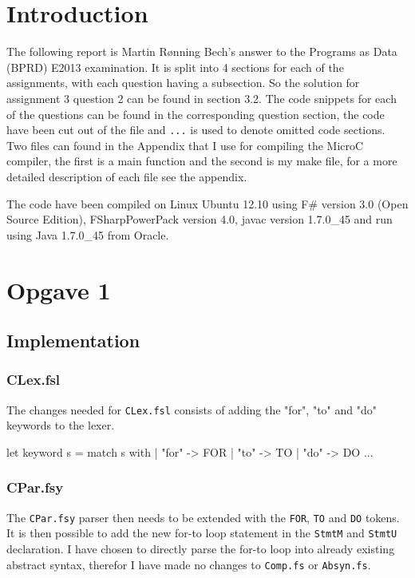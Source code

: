 \section*{Introduction}
The following report is Martin Rønning Bech's answer to the Programs as Data
(BPRD) E2013 examination. It is split into 4 sections for each of the
assignments, with each question having a subsection. So the solution for
assignment 3 question 2 can be found in section 3.2. The code snippets for each
of the questions can be found in the corresponding question section, the code
have been cut out of the file and \texttt{...} is used to denote omitted code
sections. Two files can found in the Appendix that I use for compiling the
MicroC compiler, the first is a main function and the second is my make file,
for a more detailed description of each file see the appendix.

The code have been compiled on Linux Ubuntu 12.10 using F\# version 3.0 (Open
Source Edition), FSharpPowerPack version 4.0, javac version 1.7.0\_45 and run
using Java 1.7.0\_45 from Oracle.

\tableofcontents
\pagebreak


\section{Opgave 1}
\subsection{Implementation}
\subsubsection*{CLex.fsl}
The changes needed for \texttt{CLex.fsl} consists of adding the "for", "to" and "do"
keywords to the lexer.
\begin{fs}
let keyword s =
    match s with
    | "for"     -> FOR
    | "to"      -> TO
    | "do"      -> DO
    ...
\end{fs}
\subsubsection*{CPar.fsy}
The \texttt{CPar.fsy} parser then needs to be extended with the \texttt{FOR},
\texttt{TO} and \texttt{DO} tokens. It is then possible to add the new for-to
loop statement in the \texttt{StmtM} and \texttt{StmtU} declaration. I have
chosen to directly parse the for-to loop into already existing abstract syntax,
therefor I have made no changes to \texttt{Comp.fs} or \texttt{Absyn.fs}.

